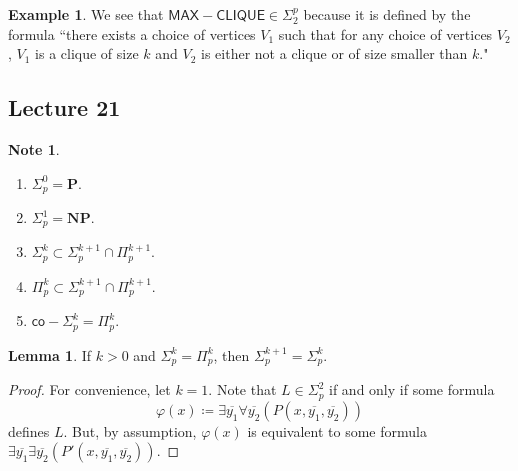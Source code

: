 \documentclass[10pt,letterpaper,cm]{nupset}
\theoremstyle{definition}
\newtheorem{exmp}{Example}
\newtheorem{note}{Note}
\newtheorem{lemma}{Lemma}
\newcommand{\1}{\mathbf{1}}
\newcommand{\0}{\vec 0}
\begin{document}
\begin{exmp} 
We see that $\mathsf{MAX{-}CLIQUE} \in \Sigma_2^p$ because it is defined by the formula ``there exists a choice of vertices $V_1$ such that for any choice of vertices $V_2$, $V_1$ is a clique of size $k$ and $V_2$ is either not a clique or of size smaller than $k$."
\end{exmp}

\subsection{Lecture 21}

\begin{note} $ $
\begin{enumerate}
\item $\Sigma_p^0 = \mathbf{P}$.
\item $\Sigma_p^1 = \mathbf{NP} $.
\item $\Sigma^k_p \subset \Sigma^{k+1}_p \cap \Pi^{k+1}_p$.
\item $\Pi^k_p \subset \Sigma^{k+1}_p \cap \Pi^{k+1}_p$.
\item $\mathsf{co}{-}\Sigma^k_p = \Pi^k_p$. 
\end{enumerate}
\end{note}

\begin{lemma}
If $k>0$ and $\Sigma_p^k = \Pi^k_p$, then $\Sigma^{k+1}_p = \Sigma^k_p$.
\end{lemma}
\begin{proof}
For convenience, let $k=1$. Note that $L \in \Sigma^2_p$ if and only if some formula $$\varphi(x)\coloneqq \exists{\overline{y_1}}\forall{\overline{y_2}}(P(x, \overline{y_1}, \overline{y_2}))$$ defines $L$. But, by assumption, $\varphi(x)$ is equivalent to some formula  $ \exists{\overline{y_1}}\exists{\overline{y_2}}(P'(x, \overline{y_1}, \overline{y_2}))$.
\end{proof}
\end{document}
